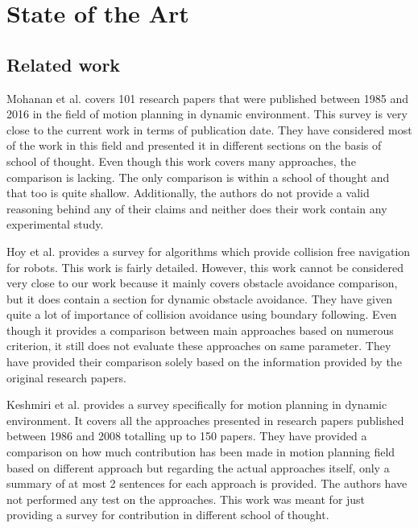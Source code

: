 
\chapter{State of the Art}

\section{Related work}%
\label{sec:related_work}

Mohanan et al.\cite{mohanan2018a} covers 101 research papers that were published between 1985 and 
2016 in the field of motion planning in dynamic environment. This survey is very close to the 
current work in terms of publication date. They have considered most of the work in this field and 
presented it in different sections on the basis of school of thought. Even though this work covers 
many approaches, the comparison is lacking. The only comparison is within a school of thought and 
that too is quite shallow. Additionally, the authors do not provide a valid reasoning behind any 
of their claims and neither does their work contain any experimental study. 

Hoy et al.\cite{hoy2015algorithms} provides a survey for algorithms which provide collision free 
navigation for robots. This work is fairly detailed. However, this work cannot be considered very close to 
our work because it mainly covers obstacle avoidance comparison, but it does contain a section for 
dynamic obstacle avoidance. They have given quite a lot of importance of collision avoidance using 
boundary following. Even though it provides a comparison between main approaches based on numerous 
criterion, it still does not evaluate these approaches on same parameter. They have provided their 
comparison solely based on the information provided by the original research papers.

Keshmiri et al.\cite{keshmiri2009overview} provides a survey specifically for motion planning 
in dynamic environment. It covers all the approaches presented in research papers published between 
1986 and 2008 totalling up to 150 papers. They have provided a comparison on how much contribution 
has been made in motion planning field based on different approach but regarding the actual 
approaches itself, only a summary of at most 2 sentences for each approach is provided. The authors
have not performed any test on the approaches. This work was meant for just providing a survey 
for contribution in different school of thought.

